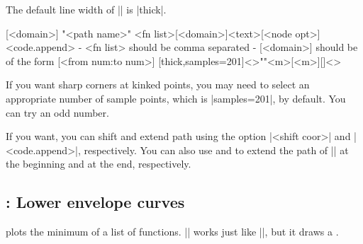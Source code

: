 The default line width of |\tzfnmax| is |thick|.

\begin{tzdef}
[<domain>]
"<path name>"
     {<fn list>}[<domain>]{<text>}[<node opt>]<code.append>
  - {<fn list>} should be comma separated
  - [<domain>] should be of the form [<from num:to num>]
  [thick,samples=201]<>""{<m>}[<m>]{}[]<>
\end{tzdef}


\begin{tzcode}{.3}
{}
\end{tzcode}

\remark If you want sharp corners at kinked points, you may need to select an appropriate number of sample points, which is |samples=201|, by default. You can try an odd number.
\remarkafterskip

If you want, you can shift and extend path using the option |<shift coor>| and |<code.append>|, respectively.
You can also use \icmd{\tzfnmaxAtBegin} and \icmd{\tzfnmaxAtEnd} to extend the path of |\tzfnmax| at the beginning and at the end, respectively.

\begin{tzcode}{.3}
\end{tzcode}


\subsection{\protect\cmd{\tzfnmin}: Lower envelope curves}
\label{ss:tzfnmin}

\icmd{\tzfnmin} plots the minimum of a list of functions. 
|\tzfnmin| works just like |\tzfnmax|, but it draws a  .

